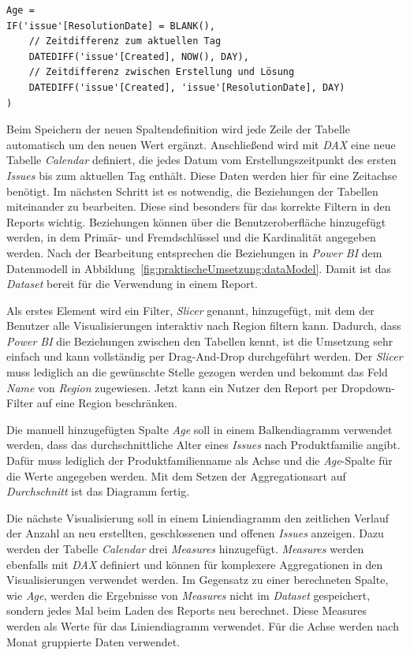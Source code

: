 \begin{minipage}{\linewidth}
\begin{lstlisting}[caption=Code zur Defintion der Spalte \textit{Age} von Tabelle \textit{Issue},captionpos=b,style=sharpc]
Age = 
IF('issue'[ResolutionDate] = BLANK(),
    // Zeitdifferenz zum aktuellen Tag
    DATEDIFF('issue'[Created], NOW(), DAY),
    // Zeitdifferenz zwischen Erstellung und Lösung
    DATEDIFF('issue'[Created], 'issue'[ResolutionDate], DAY)
)
\end{lstlisting}
\end{minipage}

\noindent Beim Speichern der neuen Spaltendefinition wird jede Zeile der Tabelle automatisch um den neuen Wert ergänzt. Anschließend wird mit \textit{DAX} eine neue Tabelle \textit{Calendar} definiert, die jedes Datum vom Erstellungszeitpunkt des ersten \textit{Issues} bis zum aktuellen Tag enthält. Diese Daten werden hier für eine Zeitachse benötigt. Im nächsten Schritt ist es notwendig, die Beziehungen der Tabellen miteinander zu bearbeiten. Diese sind besonders für das korrekte Filtern in den Reports wichtig. Beziehungen können über die Benutzeroberfläche hinzugefügt werden, in dem Primär- und Fremdschlüssel und die Kardinalität angegeben werden. Nach der Bearbeitung entsprechen die Beziehungen in \textit{Power BI} dem Datenmodell in Abbildung~\ref{fig:praktischeUmsetzung:dataModel}. Damit ist das \textit{Dataset} bereit für die Verwendung in einem Report.

Als erstes Element wird ein Filter, \textit{Slicer} genannt, hinzugefügt, mit dem der Benutzer alle Visualisierungen interaktiv nach Region filtern kann. Dadurch, dass \textit{Power BI} die Beziehungen zwischen den Tabellen kennt, ist die Umsetzung sehr einfach und kann vollständig per Drag-And-Drop durchgeführt werden. Der \textit{Slicer} muss lediglich an die gewünschte Stelle gezogen werden und bekommt das Feld \textit{Name} von \textit{Region} zugewiesen. Jetzt kann ein Nutzer den Report per Dropdown-Filter auf eine Region beschränken.

Die manuell hinzugefügten Spalte \textit{Age} soll in einem Balkendiagramm verwendet werden, dass das durchschnittliche Alter eines \textit{Issues} nach Produktfamilie angibt. Dafür muss lediglich der Produktfamilienname als Achse und die \textit{Age}-Spalte für die Werte angegeben werden. Mit dem Setzen der Aggregationsart auf \textit{Durchschnitt} ist das Diagramm fertig.

Die nächste Visualisierung soll in einem Liniendiagramm den zeitlichen Verlauf der Anzahl an neu erstellten, geschlossenen und offenen \textit{Issues} anzeigen. Dazu werden der Tabelle \textit{Calendar} drei \textit{Measures} hinzugefügt. \textit{Measures} werden ebenfalls mit \textit{DAX} definiert und können für komplexere Aggregationen in den Visualisierungen verwendet werden. Im Gegensatz zu einer berechneten Spalte, wie \textit{Age}, werden die Ergebnisse von \textit{Measures} nicht im \textit{Dataset} gespeichert, sondern jedes Mal beim Laden des Reports neu berechnet. Diese Measures werden als Werte für das Liniendiagramm verwendet. Für die Achse werden nach Monat gruppierte Daten verwendet.

